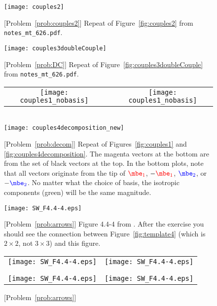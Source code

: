 \documentclass[11pt,titlepage,fleqn]{article}
\newcommand{\mtfile}{\texttt{notes\_mt\_626.pdf}}
\newcommand{\eone}{\textcolor{red}{\mbe_1}}
\newcommand{\etwo}{\textcolor{blue}{\mbe_2}}
\begin{document}
\begin{figure}
\hspace{-1cm}
\texttt{[image: couples2]}
\caption{
[Problem~\ref{prob:couples2}] 
Repeat of Figure~\ref{fig:couples2} from \mtfile.
\label{fig:template_couples2}
}
\end{figure}

\begin{figure}
\hspace{-1cm}
\texttt{[image: couples3doubleCouple]}
\caption{
[Problem~\ref{prob:DC}] 
Repeat of Figure~\ref{fig:couples3doubleCouple} from \mtfile.
\label{fig:templateDC}
}
\end{figure}

\begin{figure}
\centering
\begin{tabular}{ccc}
\texttt{[image: couples1\_nobasis]}
& \hspace{1.4cm} &
\texttt{[image: couples1\_nobasis]}
\end{tabular}
\\
\makebox{\hspace{0.5cm}}
\texttt{[image: couples4decomposition\_new]}
\caption{
[Problem~\ref{prob:decom}]
Repeat of Figures~\ref{fig:couples1} and \ref{fig:couples4decomposition}.
The magenta vectors at the bottom are from the set of black vectors at the top.
In the bottom plots, note that all vectors originate from the tip of $\eone$, $-\eone$, $\etwo$, or $-\etwo$.
No matter what the choice of basis, the isotropic components (green) will be the same magnitude.
\label{fig:decom}
}
\end{figure}


\begin{figure}
\centering
\texttt{[image: SW\_F4.4-4.eps]}
\caption{
[Problem~\ref{prob:arrows}]
Figure 4.4-4 from \citet{SteinWysession}.
After the exercise you should see the connection between Figure~\ref{fig:template4} (which is $2 \times 2$, not $3 \times 3$) and this figure.
\label{fig:SW}
}
\end{figure}

\begin{figure}
\hspace{-1cm}
\begin{tabular}{c|c}
\texttt{[image: SW\_F4.4-4.eps]} & \texttt{[image: SW\_F4.4-4.eps]} \\
& \\ \hline
& \\
\texttt{[image: SW\_F4.4-4.eps]} & \texttt{[image: SW\_F4.4-4.eps]} 
\end{tabular}
\caption{
[Problem~\ref{prob:arrows}]
\label{fig:SWfour}
}
\end{figure}

\clearpage\pagebreak


\end{document}

